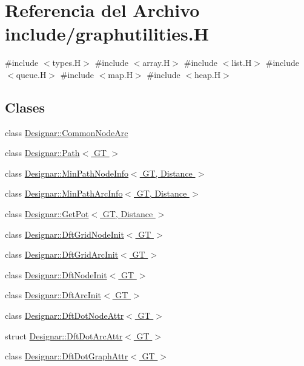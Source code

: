 \hypertarget{graphutilities_8_h}{}\section{Referencia del Archivo include/graphutilities.H}
\label{graphutilities_8_h}
{\ttfamily \#include $<$types.\+H$>$}\newline
{\ttfamily \#include $<$array.\+H$>$}\newline
{\ttfamily \#include $<$list.\+H$>$}\newline
{\ttfamily \#include $<$queue.\+H$>$}\newline
{\ttfamily \#include $<$map.\+H$>$}\newline
{\ttfamily \#include $<$heap.\+H$>$}\newline
\subsection*{Clases}
\begin{DoxyCompactItemize}
\item 
class \hyperlink{class_designar_1_1_common_node_arc}{Designar\+::\+Common\+Node\+Arc}
\item 
class \hyperlink{class_designar_1_1_path}{Designar\+::\+Path$<$ G\+T $>$}
\item 
class \hyperlink{class_designar_1_1_min_path_node_info}{Designar\+::\+Min\+Path\+Node\+Info$<$ G\+T, Distance $>$}
\item 
class \hyperlink{class_designar_1_1_min_path_arc_info}{Designar\+::\+Min\+Path\+Arc\+Info$<$ G\+T, Distance $>$}
\item 
class \hyperlink{class_designar_1_1_get_pot}{Designar\+::\+Get\+Pot$<$ G\+T, Distance $>$}
\item 
class \hyperlink{class_designar_1_1_dft_grid_node_init}{Designar\+::\+Dft\+Grid\+Node\+Init$<$ G\+T $>$}
\item 
class \hyperlink{class_designar_1_1_dft_grid_arc_init}{Designar\+::\+Dft\+Grid\+Arc\+Init$<$ G\+T $>$}
\item 
class \hyperlink{class_designar_1_1_dft_node_init}{Designar\+::\+Dft\+Node\+Init$<$ G\+T $>$}
\item 
class \hyperlink{class_designar_1_1_dft_arc_init}{Designar\+::\+Dft\+Arc\+Init$<$ G\+T $>$}
\item 
class \hyperlink{class_designar_1_1_dft_dot_node_attr}{Designar\+::\+Dft\+Dot\+Node\+Attr$<$ G\+T $>$}
\item 
struct \hyperlink{struct_designar_1_1_dft_dot_arc_attr}{Designar\+::\+Dft\+Dot\+Arc\+Attr$<$ G\+T $>$}
\item 
class \hyperlink{class_designar_1_1_dft_dot_graph_attr}{Designar\+::\+Dft\+Dot\+Graph\+Attr$<$ G\+T $>$}
\end{DoxyCompactItemize}
